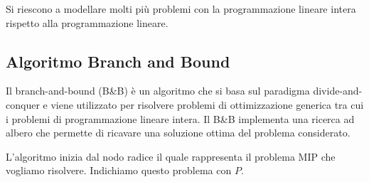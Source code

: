 Si riescono a modellare molti più problemi con la programmazione lineare
intera rispetto alla programmazione lineare.

\subsection{Algoritmo Branch and Bound}%
\label{sub:Algoritmo Branch And Bound}
Il branch-and-bound (B\&B) è un algoritmo che si basa sul paradigma 
divide-and-conquer e viene utilizzato per risolvere problemi di ottimizzazione 
generica tra cui i problemi di programmazione lineare intera.
Il B\&B implementa una ricerca ad albero che permette di 
ricavare una soluzione ottima del problema considerato.

L'algoritmo inizia dal nodo radice il quale rappresenta il problema MIP
che vogliamo risolvere. Indichiamo questo problema con $P$.

